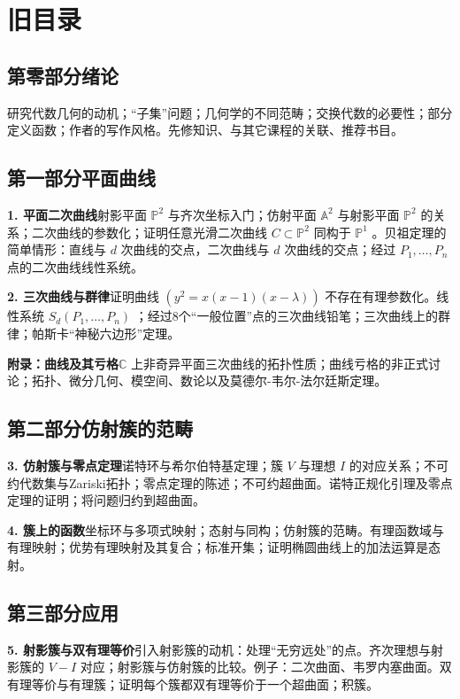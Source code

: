 \chapter*{旧目录}

\section*{第零部分\quad 绪论}
研究代数几何的动机；“子集”问题；几何学的不同范畴；交换代数的必要性；部分定义函数；作者的写作风格。先修知识、与其它课程的关联、推荐书目。

\section*{第一部分\quad 平面曲线}

\noindent
\textbf{1. 平面二次曲线}\quad 射影平面 \({\mathbb{P}}^{2}\) 与齐次坐标入门；仿射平面 \({\mathbb{A}}^{2}\) 与射影平面 \({\mathbb{P}}^{2}\) 的关系；二次曲线的参数化；证明任意光滑二次曲线 \(C \subset  {\mathbb{P}}^{2}\) 同构于 \({\mathbb{P}}^{1}\) 。贝祖定理的简单情形：直线与 \(d\) 次曲线的交点，二次曲线与 \(d\) 次曲线的交点；经过 \({P}_{1},\ldots ,{P}_{n}\) 点的二次曲线线性系统。

\noindent
\textbf{2. 三次曲线与群律}\quad 证明曲线 \(\left( {{y}^{2} = x\left( {x - 1}\right) \left( {x - \lambda }\right) }\right)\) 不存在有理参数化。线性系统 \({S}_{d}\left( {{P}_{1},\ldots ,{P}_{n}}\right)\) ；经过8个“一般位置”点的三次曲线铅笔；三次曲线上的群律；帕斯卡“神秘六边形”定理。

\noindent
\textbf{附录：曲线及其亏格}\quad \(\mathbb{C}\) 上非奇异平面三次曲线的拓扑性质；曲线亏格的非正式讨论；拓扑、微分几何、模空间、数论以及莫德尔-韦尔-法尔廷斯定理。

\section*{第二部分\quad 仿射簇的范畴}
\noindent
\textbf{3. 仿射簇与零点定理}\quad 诺特环与希尔伯特基定理；簇 \(V\) 与理想 \(I\) 的对应关系；不可约代数集与Zariski拓扑；零点定理的陈述；不可约超曲面。诺特正规化引理及零点定理的证明；将问题归约到超曲面。

\noindent
\textbf{4. 簇上的函数}\quad 坐标环与多项式映射；态射与同构；仿射簇的范畴。有理函数域与有理映射；优势有理映射及其复合；标准开集；证明椭圆曲线上的加法运算是态射。

\section*{第三部分\quad 应用}
\noindent
\textbf{5. 射影簇与双有理等价}\quad 引入射影簇的动机：处理“无穷远处”的点。齐次理想与射影簇的 \(V-I\) 对应；射影簇与仿射簇的比较。例子：二次曲面、韦罗内塞曲面。双有理等价与有理簇；证明每个簇都双有理等价于一个超曲面；积簇。

